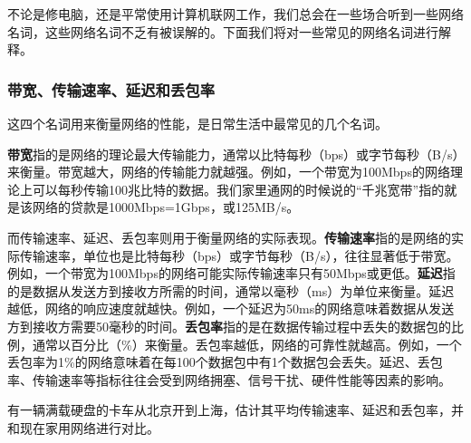 不论是修电脑，还是平常使用计算机联网工作，我们总会在一些场合听到一些网络名词，这些网络名词不乏有被误解的。下面我们将对一些常见的网络名词进行解释。

\subsubsection{带宽、传输速率、延迟和丢包率}

这四个名词用来衡量网络的性能，是日常生活中最常见的几个名词。

\textbf{带宽}指的是网络的理论最大传输能力，通常以比特每秒（bps）或字节每秒（B/s）来衡量。带宽越大，网络的传输能力就越强。例如，一个带宽为100Mbps的网络理论上可以每秒传输100兆比特的数据。我们家里通网的时候说的“千兆宽带”指的就是该网络的贷款是1000Mbps=1Gbps，或125MB/s。

而传输速率、延迟、丢包率则用于衡量网络的实际表现。\textbf{传输速率}指的是网络的实际传输速率，单位也是比特每秒（bps）或字节每秒（B/s），往往显著低于带宽。例如，一个带宽为100Mbps的网络可能实际传输速率只有50Mbps或更低。\textbf{延迟}指的是数据从发送方到接收方所需的时间，通常以毫秒（ms）为单位来衡量。延迟越低，网络的响应速度就越快。例如，一个延迟为50ms的网络意味着数据从发送方到接收方需要50毫秒的时间。\textbf{丢包率}指的是在数据传输过程中丢失的数据包的比例，通常以百分比（\%）来衡量。丢包率越低，网络的可靠性就越高。例如，一个丢包率为1\%的网络意味着在每100个数据包中有1个数据包会丢失。延迟、丢包率、传输速率等指标往往会受到网络拥塞、信号干扰、硬件性能等因素的影响。

\begin{example}
  有一辆满载硬盘的卡车从北京开到上海，估计其平均传输速率、延迟和丢包率，并和现在家用网络进行对比。
\end{example}


